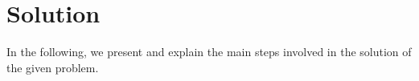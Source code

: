 \section{Solution}
\label{sec:solution}

In the following, we present and explain the main steps involved in the solution of the given problem.






